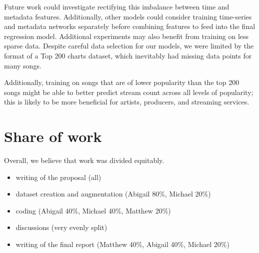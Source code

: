 \documentclass[11pt]{article}
\begin{document}
Future work could investigate rectifying this imbalance between time and metadata features. Additionally, other models could consider training time-series and metadata networks separately before combining features to feed into the final regression model. Additional experiments may also benefit from training on less sparse data. Despite careful data selection for our models, we were limited by the format of a Top 200 charts dataset, which inevitably had missing data points for many songs.

Additionally, training on songs that are of lower popularity than the top 200 songs might be able to better predict stream count across all levels of popularity; this is likely to be more beneficial for artists, producers, and streaming services.

% 


% 
\section{Share of work}

Overall, we believe that work was divided equitably.
% 
% 
\begin{itemize}
\item writing of the proposal  (all)
\item dataset creation and augmentation (Abigail 80\%, Michael 20\%)
\item coding (Abigail 40\%, Michael 40\%, Matthew 20\%)
\item discussions (very evenly split) 
\item writing of the final report (Matthew 40\%, Abigail 40\%, Michael 20\%)
\end{itemize}



\end{document}
